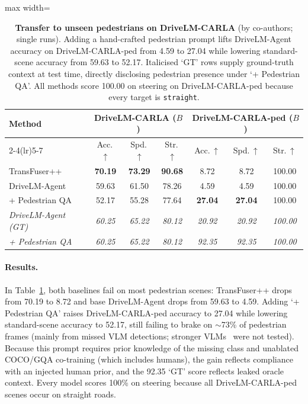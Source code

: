\begin{table}[t]
  \centering
  \caption[Transfer to unseen pedestrians on DriveLM-CARLA]{\textbf{Transfer to unseen pedestrians on DriveLM-CARLA} (by co-authors; single runs). Adding a hand-crafted pedestrian prompt lifts DriveLM-Agent accuracy on DriveLM-CARLA-ped from 4.59 to 27.04 while lowering standard-scene accuracy from 59.63 to 52.17. Italicised `GT' rows supply ground-truth context at test time, directly disclosing pedestrian presence under `+ Pedestrian QA'. All methods score 100.00 on steering on DriveLM-CARLA-ped because every target is \texttt{straight}.}
  \label{drivelm:tab:carla}
  \begin{adjustbox}{max width=\textwidth}
  \begin{tabular}{l|ccc|ccc}
    \toprule
    \multirow{2}{*}{\textbf{Method}} & \multicolumn{3}{c|}{\textbf{DriveLM-CARLA} ($B$)} & \multicolumn{3}{c}{\textbf{DriveLM-CARLA-ped} ($B$)} \\
    \cmidrule(lr){2-4}\cmidrule(lr){5-7}
    & Acc.\,$\uparrow$ & Spd.\,$\uparrow$ & Str.\,$\uparrow$ & Acc.\,$\uparrow$ & Spd.\,$\uparrow$ & Str.\,$\uparrow$ \\
    \midrule
    TransFuser++~\cite{jaeger2023hidden} & \textbf{70.19} & \textbf{73.29} & \textbf{90.68} & 8.72 & 8.72 & 100.00 \\
    \midrule
    \rowcolor[gray]{0.9} DriveLM-Agent & 59.63 & 61.50 & 78.26 & 4.59 & 4.59 & 100.00 \\
    \rowcolor[gray]{0.9} \quad + Pedestrian QA & 52.17 & 55.28 & 77.64 & \textbf{27.04} & \textbf{27.04} & 100.00 \\
    \midrule
    \textit{DriveLM-Agent (GT)} & \textit{60.25} & \textit{65.22} & \textit{80.12} & \textit{20.92} & \textit{20.92} & \textit{100.00} \\
    \textit{\quad + Pedestrian QA} & \textit{60.25} & \textit{65.22} & \textit{80.12} & \textit{92.35} & \textit{92.35} & \textit{100.00} \\
    \bottomrule
  \end{tabular}
  \end{adjustbox}
\end{table}

\paragraph{Results.}
In Table~\ref{drivelm:tab:carla}, both baselines fail on most pedestrian scenes: TransFuser++ drops from 70.19 to 8.72 and base DriveLM-Agent drops from 59.63 to 4.59. Adding `+ Pedestrian QA' raises DriveLM-CARLA-ped accuracy to 27.04 while lowering standard-scene accuracy to 52.17, still failing to brake on $\sim$73\% of pedestrian frames (mainly from missed VLM detections; stronger VLMs~\cite{gao2023llamaadapterv2,peng2023kosmos} were not tested). Because this prompt requires prior knowledge of the missing class and unablated COCO/GQA co-training (which includes humans), the gain reflects compliance with an injected human prior, and the 92.35 `GT' score reflects leaked oracle context. Every model scores 100\% on steering because all DriveLM-CARLA-ped scenes occur on straight roads.

